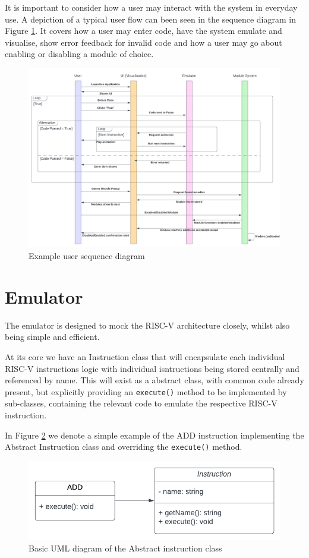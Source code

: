 It is important to consider how a user may interact with the system in everyday use. A depiction of a typical user flow can been seen in the sequence diagram in Figure \ref{fig:user_sequence}. It covers how a user may enter code, have the system emulate and visualise, show error feedback for invalid code and how a user may go about enabling or disabling a module of choice.

\begin{figure}[h]
    \centering
    \includegraphics[width=0.95\linewidth]{dissertation/DATA/sequence diagram.png}
    \caption{Example user sequence diagram}
    \label{fig:user_sequence}
\end{figure}

\section{Emulator}
The emulator is designed to mock the RISC-V architecture closely, whilst also being simple and efficient.

At its core we have an Instruction class that will encapsulate each individual RISC-V instructions logic with individual isntructions being stored centrally and referenced by name. This will exist as a abstract class, with common code already present, but explicitly providing an \verb|execute()| method to be implemented by sub-classes, containing the relevant code to emulate the respective RISC-V instruction. 

In Figure \ref{fig:instr_abstract_uml} we denote a simple example of the ADD instruction implementing the Abstract Instruction class and overriding the \verb|execute()| method.

\begin{figure}[H]
    \centering
    \includegraphics[width=0.95\linewidth]{dissertation/DATA/instr_abstract_uml.png}
    \caption{Basic UML diagram of the Abstract instruction class}
    \label{fig:instr_abstract_uml}
\end{figure}

